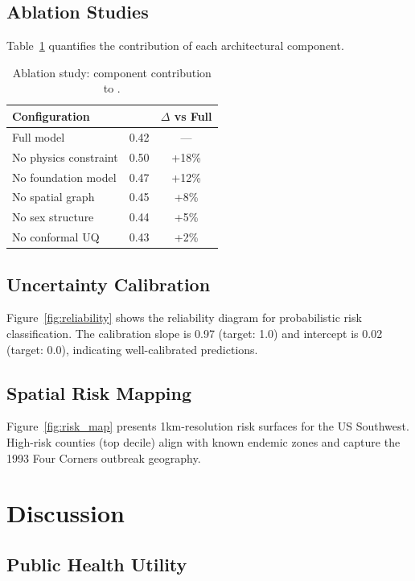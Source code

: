 \documentclass[11pt,a4paper]{article}
\newcommand{\WIS}{\text{WIS}}
\begin{document}
\subsection{Ablation Studies}

Table~\ref{tab:ablation} quantifies the contribution of each architectural component.

\begin{table}[htbp]
\centering
\caption{Ablation study: component contribution to \WIS.}
\label{tab:ablation}
\begin{tabular}{lcc}
\toprule
Configuration & \WIS & $\Delta$ vs Full \\
\midrule
Full model & 0.42 & --- \\
No physics constraint & 0.50 & +18\% \\
No foundation model & 0.47 & +12\% \\
No spatial graph & 0.45 & +8\% \\
No sex structure & 0.44 & +5\% \\
No conformal UQ & 0.43 & +2\% \\
\bottomrule
\end{tabular}
\end{table}

\subsection{Uncertainty Calibration}

Figure~\ref{fig:reliability} shows the reliability diagram for probabilistic risk classification. The calibration slope is 0.97 (target: 1.0) and intercept is 0.02 (target: 0.0), indicating well-calibrated predictions.

\subsection{Spatial Risk Mapping}

Figure~\ref{fig:risk_map} presents 1km-resolution risk surfaces for the US Southwest. High-risk counties (top decile) align with known endemic zones and capture the 1993 Four Corners outbreak geography.

\section{Discussion}

\subsection{Public Health Utility}
\end{document}
